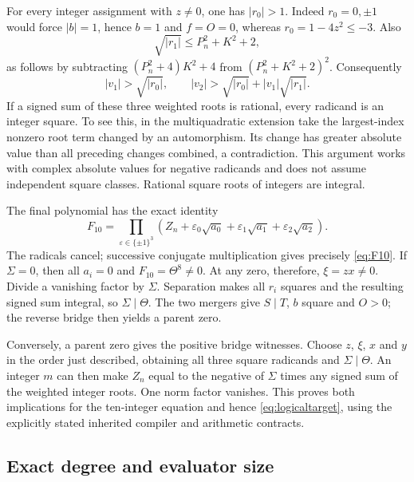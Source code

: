 For every integer assignment with $z\ne0$, one has $|r_0|>1$.
Indeed $r_0=0,\pm1$ would force $|b|=1$, hence $b=1$ and
$f=O=0$, whereas $r_0=1-4z^2\le-3$.
Also
\[
 \sqrt{|r_1|}\le P_n^2+K^2+2,
\]
as follows by subtracting $(P_n^2+4)K^2+4$ from
$(P_n^2+K^2+2)^2$. Consequently
\[
 |v_1|>\sqrt{|r_0|},\qquad
 |v_2|>\sqrt{|r_0|}+|v_1|\sqrt{|r_1|}.
\]
If a signed sum of these three weighted roots is rational, every
radicand is an integer square. To see this, in the multiquadratic
extension take the largest-index nonzero root term changed by an
automorphism. Its change has greater absolute value than all preceding
changes combined, a contradiction. This argument works with complex
absolute values for negative radicands and does not assume independent
square classes. Rational square roots of integers are integral.

The final polynomial has the exact identity
\[
 F_{10}=\prod_{\varepsilon\in\{\pm1\}^3}
 \left(Z_n+\varepsilon_0\sqrt{a_0}
           +\varepsilon_1\sqrt{a_1}
           +\varepsilon_2\sqrt{a_2}\right).
\]
The radicals cancel; successive conjugate multiplication gives precisely
\eqref{eq:F10}. If $\Sigma=0$, then all $a_i=0$ and
$F_{10}=\Theta^8\ne0$. At any zero, therefore, $\xi=zx\ne0$.
Divide a vanishing factor by $\Sigma$. Separation makes all $r_i$
squares and the resulting signed sum integral, so $\Sigma\mid\Theta$.
The two mergers give $S\mid T$, $b$ square and $O>0$; the reverse
bridge then yields a parent zero.

Conversely, a parent zero gives the positive bridge witnesses. Choose
$z$, $\xi$, $x$ and $y$ in the order just described, obtaining all
three square radicands and $\Sigma\mid\Theta$. An integer $m$ can
then make $Z_n$ equal to the negative of $\Sigma$ times any signed
sum of the weighted integer roots. One norm factor vanishes.
This proves both implications for the ten-integer equation and hence
\eqref{eq:logicaltarget}, using the explicitly stated inherited
compiler and arithmetic contracts.

\subsection{Exact degree and evaluator size}

